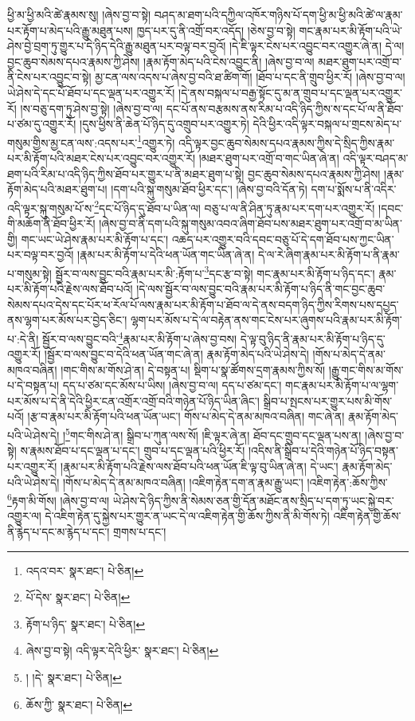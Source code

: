 ཕྱི་མ་ཕྱི་མའི་ཚེ་རྣམས་སུ། །ཞེས་བྱ་བ་སྟེ། བཤད་མ་ཐག་པའི་དཀྱིལ་འཁོར་གཉིས་པོ་དག་ཕྱི་མ་ཕྱི་མའི་ཚེ་ལ་རྣམ་པར་རྟོག་པ་མེད་པའི་རྒྱུ་མཐུན་པས། ཁྱད་པར་དུ་ནི་འགྲོ་བར་འདོད། །ཅེས་བྱ་བ་སྟེ། གང་རྣམ་པར་མི་རྟོག་པའི་ཡེ་ཤེས་བྱེ་བྲག་ཏུ་གྱུར་པ་དེ་ཉིད་དེའི་རྒྱུ་མཐུན་པར་བལྟ་བར་བྱའོ། །དེ་ཇི་ལྟར་ངེས་པར་འབྱུང་བར་འགྱུར་ཞེ་ན། དེ་ལ། བྱང་ཆུབ་སེམས་དཔའ་རྣམས་ཀྱི་ཤེས། །རྣམ་རྟོག་མེད་པའི་ངེས་འབྱུང་ནི། །ཞེས་བྱ་བ་ལ། མཐར་ཐུག་པར་འགྲོ་བ་ནི་ངེས་པར་འབྱུང་བ་སྟེ། མྱ་ངན་ལས་འདས་པ་ཞེས་བྱ་བའི་ཐ་ཚིག་གོ། །ཐོབ་པ་དང་ནི་གྲུབ་ཕྱིར་རོ། །ཞེས་བྱ་བ་ལ། ཡེ་ཤེས་དེ་དང་པོ་ཐོབ་པ་དང་ལྡན་པར་འགྱུར་རོ། །དེ་ནས་བསྐལ་པ་བརྒྱ་སྟོང་དུ་མ་ན་གྲུབ་པ་དང་ལྡན་པར་འགྱུར་རོ། །ས་བཅུ་དག་ཏུ་ཤེས་བྱ་སྟེ། །ཞེས་བྱ་བ་ལ། དང་པོ་ནས་བརྩམས་ནས་རིམ་པ་འདི་ཉིད་ཀྱིས་ས་དང་པོ་ལ་ནི་ཐོབ་པ་ཙམ་དུ་འགྱུར་རོ། །དུས་ཕྱིས་ནི་ཆེན་པོ་ཉིད་དུ་འགྲུབ་པར་འགྱུར་ཏེ། དེའི་ཕྱིར་འདི་ལྟར་བསྐལ་པ་གྲངས་མེད་པ་གསུམ་གྱིས་མྱ་ངན་ལས་:འདས་པར་\footnote{འདའ་བར་  སྣར་ཐང་།  པེ་ཅིན། }འགྱུར་ཏེ། འདི་ལྟར་བྱང་ཆུབ་སེམས་དཔའ་རྣམས་ཀྱིས་དེ་སྲིད་ཀྱིས་རྣམ་པར་མི་རྟོག་པའི་མཐར་ངེས་པར་འབྱུང་བར་འགྱུར་རོ། །མཐར་ཐུག་པར་འགྲོ་བ་གང་ཡིན་ཞེ་ན། འདི་ལྟར་བཤད་མ་ཐག་པའི་རིམ་པ་འདི་ཉིད་ཀྱིས་ཐོབ་པར་གྱུར་པ་ནི་མཐར་ཐུག་པ་སྟེ། བྱང་ཆུབ་སེམས་དཔའ་རྣམས་ཀྱི་ཤེས། །རྣམ་རྟོག་མེད་པའི་མཐར་ཐུག་པ། །དག་པའི་སྐུ་གསུམ་ཐོབ་ཕྱིར་དང་། །ཞེས་བྱ་བའི་དོན་ཏེ། དག་པ་སྨོས་པ་ནི་འདིར་འདི་ལྟར་སྐུ་གསུམ་པོ་ས་\footnote{པོ་དེས་  སྣར་ཐང་།  པེ་ཅིན། }དང་པོ་ཉིད་དུ་ཐོབ་པ་ཡིན་ལ། བཅུ་པ་ལ་ནི་ཤིན་ཏུ་རྣམ་པར་དག་པར་འགྱུར་རོ། །དབང་གི་མཆོག་ནི་ཐོབ་ཕྱིར་རོ། །ཞེས་བྱ་བ་ནི་དག་པའི་སྐུ་གསུམ་འབའ་ཞིག་ཐོབ་པས་མཐར་ཐུག་པར་འགྲོ་བ་མ་ཡིན་གྱི། གང་ཡང་ཡེ་ཤེས་རྣམ་པར་མི་རྟོག་པ་དང་། འཆད་པར་འགྱུར་བའི་དབང་བཅུ་པོ་དེ་དག་ཐོབ་པས་ཀྱང་ཡིན་པར་བལྟ་བར་བྱའོ། །རྣམ་པར་མི་རྟོག་པ་དེའི་ཕན་ཡོན་གང་ཡིན་ཞེ་ན། དེ་ལ་རེ་ཞིག་རྣམ་པར་མི་རྟོག་པ་ནི་རྣམ་པ་གསུམ་སྟེ། སྦྱོར་བ་ལས་བྱུང་བའི་རྣམ་པར་མི་:རྟོག་པ་\footnote{རྟོག་པ་ཉིད་  སྣར་ཐང་།  པེ་ཅིན། }དང་རྩ་བ་སྟེ། གང་རྣམ་པར་མི་རྟོག་པ་ཉིད་དང་། རྣམ་པར་མི་རྟོག་པའི་རྗེས་ལས་ཐོབ་པའོ། །དེ་ལས་སྦྱོར་བ་ལས་བྱུང་བའི་རྣམ་པར་མི་རྟོག་པ་ཉིད་ནི་གང་བྱང་ཆུབ་སེམས་དཔའ་དེས་དང་པོར་ཕ་རོལ་པོ་ལས་རྣམ་པར་མི་རྟོག་པ་ཐོབ་ལ་དེ་ནས་བདག་ཉིད་ཀྱིས་རིགས་པས་དཔྱད་ནས་ལྷག་པར་མོས་པར་བྱེད་ཅིང་། ལྷག་པར་མོས་པ་དེ་ལ་བརྟེན་ནས་གང་ངེས་པར་ཞུགས་པའི་རྣམ་པར་མི་རྟོག་པ་:དེ་ནི། སྦྱོར་བ་ལས་བྱུང་བའི་\footnote{ཞེས་བྱ་བ་སྟེ། འདི་ལྟར་དེའི་ཕྱིར་  སྣར་ཐང་།  པེ་ཅིན། }རྣམ་པར་མི་རྟོག་པ་ཞེས་བྱ་བས། དེ་ལྟ་བུ་ཉིད་ནི་རྣམ་པར་མི་རྟོག་པ་ཉིད་དུ་འགྱུར་རོ། །སྦྱོར་བ་ལས་བྱུང་བ་དེའི་ཕན་ཡོན་གང་ཞེ་ན། རྣམ་རྟོག་མེད་པའི་ཡེ་ཤེས་དེ། །གོས་པ་མེད་དེ་ནམ་མཁའ་བཞིན། །གང་གིས་མ་གོས་ཤེ་ན། དེ་བསྟན་པ། སྡིག་པ་སྣ་ཚོགས་དྲག་རྣམས་ཀྱིས་སོ། །རྒྱུ་གང་གིས་མ་གོས་པ་དེ་བསྟན་པ། དད་པ་ཙམ་དང་མོས་པ་ཡིས། །ཞེས་བྱ་བ་ལ། དད་པ་ཙམ་དང་། གང་རྣམ་པར་མི་རྟོག་པ་ལ་ལྷག་པར་མོས་པ་དེ་ནི་དེའི་ཕྱིར་ངན་འགྲོར་འགྲོ་བའི་གཉེན་པོ་ཉིད་ཡིན་ཞིང་། སྒྲིབ་པ་སྤངས་པར་གྱུར་པས་མི་གོས་པའོ། །རྩ་བ་རྣམ་པར་མི་རྟོག་པའི་ཕན་ཡོན་ཡང་། གོས་པ་མེད་དེ་ནམ་མཁའ་བཞིན། གང་ཞེ་ན། རྣམ་རྟོག་མེད་པའི་ཡེ་ཤེས་དེ། །\footnote{། །དེ་  སྣར་ཐང་།  པེ་ཅིན། }གང་གིས་ཤེ་ན། སྒྲིབ་པ་ཀུན་ལས་སོ། །ཇི་ལྟར་ཞེ་ན། ཐོབ་དང་གྲུབ་དང་ལྡན་པས་ན། །ཞེས་བྱ་བ་སྟེ། ས་རྣམས་ཐོབ་པ་དང་ལྡན་པ་དང་། གྲུབ་པ་དང་ལྡན་པའི་ཕྱིར་རོ། །འདིས་ནི་སྒྲིབ་པ་དེའི་གཉེན་པོ་ཉིད་བསྟན་པར་འགྱུར་རོ། །རྣམ་པར་མི་རྟོག་པའི་རྗེས་ལས་ཐོབ་པའི་ཕན་ཡོན་ཇི་ལྟ་བུ་ཡིན་ཞེ་ན། དེ་ཡང་། རྣམ་རྟོག་མེད་པའི་ཡེ་ཤེས་དེ། །གོས་པ་མེད་དེ་ནམ་མཁའ་བཞིན། །འཇིག་རྟེན་དག་ན་རྣམ་རྒྱུ་ཡང་། །འཇིག་རྟེན་:ཆོས་ཀྱིས་\footnote{ཆོས་ཀྱི་  སྣར་ཐང་།  པེ་ཅིན། }རྟག་མི་གོས། །ཞེས་བྱ་བ་ལ། ཡེ་ཤེས་དེ་ཉིད་ཀྱིས་ནི་སེམས་ཅན་གྱི་དོན་མཐོང་ནས་སྲིད་པ་དག་ཏུ་ཡང་སྐྱེ་བར་འགྱུར་ལ། དེ་འཇིག་རྟེན་དུ་སྐྱེས་པར་གྱུར་ན་ཡང་དེ་ལ་འཇིག་རྟེན་གྱི་ཆོས་ཀྱིས་ནི་མི་གོས་ཏེ། འཇིག་རྟེན་གྱི་ཆོས་ནི་རྙེད་པ་དང་མ་རྙེད་པ་དང་། གྲགས་པ་དང་། 